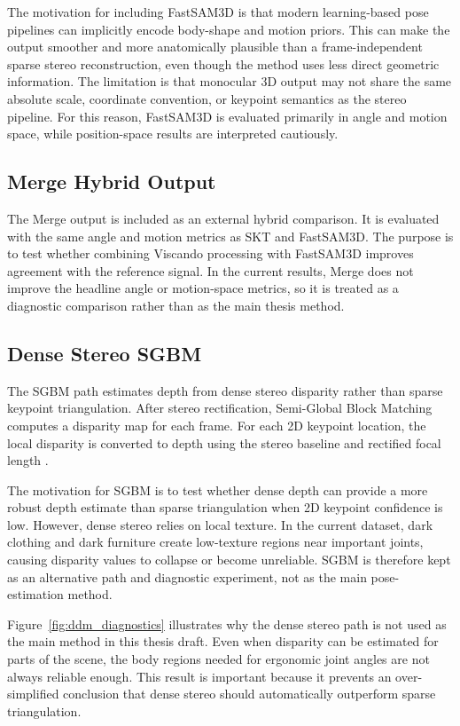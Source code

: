 \documentclass[12pt,a4paper]{article}
\begin{document}
The motivation for including FastSAM3D is that modern learning-based pose
pipelines can implicitly encode body-shape and motion priors.
This can make the output smoother and more anatomically plausible than a
frame-independent sparse stereo reconstruction, even though the method uses
less direct geometric information.
The limitation is that monocular 3D output may not share the same absolute
scale, coordinate convention, or keypoint semantics as the stereo pipeline.
For this reason, FastSAM3D is evaluated primarily in angle and motion space,
while position-space results are interpreted cautiously.

\subsection{Merge Hybrid Output}

The Merge output is included as an external hybrid comparison.
It is evaluated with the same angle and motion metrics as SKT and FastSAM3D.
The purpose is to test whether combining Viscando processing with FastSAM3D
improves agreement with the reference signal.
In the current results, Merge does not improve the headline angle or
motion-space metrics, so it is treated as a diagnostic comparison rather than
as the main thesis method.

\subsection{Dense Stereo SGBM}

The SGBM path estimates depth from dense stereo disparity rather than sparse
keypoint triangulation.
After stereo rectification, Semi-Global Block Matching computes a disparity
map for each frame.
For each 2D keypoint location, the local disparity is converted to depth using
the stereo baseline and rectified focal length \cite{hirschmuller2007sgbm}.

The motivation for SGBM is to test whether dense depth can provide a more
robust depth estimate than sparse triangulation when 2D keypoint confidence is
low.
However, dense stereo relies on local texture.
In the current dataset, dark clothing and dark furniture create low-texture
regions near important joints, causing disparity values to collapse or become
unreliable.
SGBM is therefore kept as an alternative path and diagnostic experiment, not as
the main pose-estimation method.

Figure~\ref{fig:ddm_diagnostics} illustrates why the dense stereo path is not
used as the main method in this thesis draft.
Even when disparity can be estimated for parts of the scene, the body regions
needed for ergonomic joint angles are not always reliable enough.
This result is important because it prevents an over-simplified conclusion
that dense stereo should automatically outperform sparse triangulation.
\end{document}
